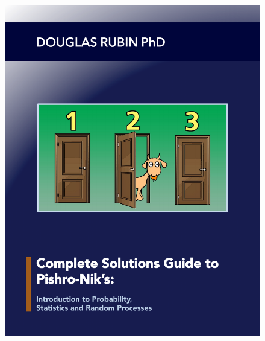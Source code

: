\documentclass[11pt]{book}
\makeatletter
\renewcommand{\maketitle} %
{ \begingroup \vskip 10pt \begin{center} \Huge {\bf \@title}
    \vskip 10pt \large \@author \hskip 20pt \@date \end{center}
  \vskip 10pt \endgroup \setcounter{footnote}{0} }
\makeatother
\begin{document}





	\begin{figure}[h]
\centering
\vspace*{-2.54cm}  
\hspace*{-2.63cm}  
     \includegraphics[totalheight=11in]{book_cover.pdf}
	\end{figure}
\end{document}
